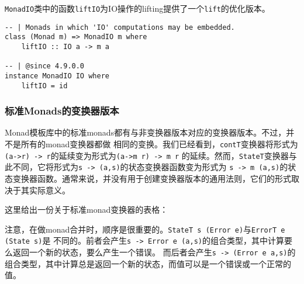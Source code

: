 \indent{}\texttt{MonadIO}类中的函数\texttt{liftIO}为IO操作的lifting提供了一个\texttt{lift}的优化版本。
\begin{verbatim}
-- | Monads in which 'IO' computations may be embedded.
class (Monad m) => MonadIO m where
    liftIO :: IO a -> m a

-- | @since 4.9.0.0
instance MonadIO IO where
    liftIO = id
\end{verbatim}

\subsubsection{标准Monads的变换器版本}
\indent{}Monad模板库中的标准monads都有与非变换器版本对应的变换器版本。不过，并不是所有的monad变换器都做
相同的变换。我们已经看到，\texttt{contT}变换器将形式为\texttt{(a->r) -> r}的延续变为形式为\texttt{(a->m r) -> m r}
的延续。然而，\texttt{StateT}变换器与此不同，它将形式为\texttt{s -> (a,s)}的状态变换器函数变为形式为
\texttt{s -> m (a,s)}的状态变换器函数。通常来说，并没有用于创建变换器版本的通用法则，它们的形式取决于其实际意义。

\indent{}这里给出一份关于标准monad变换器的表格：
\begin{table}[h]
\begin{center}
\end{center}
\end{table}

\indent{}注意，在做monad合并时，顺序是很重要的。\texttt{StateT s (Error e)}与\texttt{ErrorT e (State s)}是
不同的。前者会产生\texttt{s -> Error e (a,s)}的组合类型，其中计算要么返回一个新的状态，要么产生一个错误。
而后者会产生\texttt{s -> (Error e a,s)}的组合类型，其中计算总是返回一个新的状态，而值可以是一个错误或一个正常的值。

